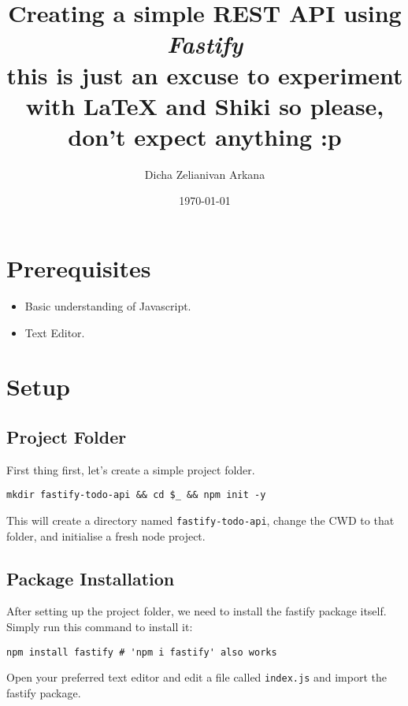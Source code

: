 \documentclass[a4paper,14pt,titlepage]{article}
\title{
  Creating a simple REST API using \textbf{\textit{Fastify}}\\[2ex]
  \small this is just an excuse to experiment with {\LaTeX} and Shiki so
  please, don't expect anything :p
}
\author{Dicha Zelianivan Arkana}
\date{\today}
\def\c#1{\texttt{#1}}
\begin{document}
\setlength{\parindent}{0pt}


\maketitle\newpage

\renewcommand{\contentsname}{Table of Contents}
\tableofcontents\newpage

\section{Prerequisites}

\begin{itemize}
  \item Basic understanding of Javascript.
  \item Text Editor.
\end{itemize}

\section{Setup}
\subsection{Project Folder}

First thing first, let's create a simple project folder.

\begin{verbatim}
mkdir fastify-todo-api && cd $_ && npm init -y
\end{verbatim}

This will create a directory named \c{fastify-todo-api}, change the CWD
to that folder, and initialise a fresh node project.

\subsection{Package Installation}

After setting up the project folder, we need to install the fastify package
itself. Simply run this command to install it:

\begin{verbatim}
npm install fastify # 'npm i fastify' also works
\end{verbatim}

Open your preferred text editor and edit a file called
\c{index.js} and import the fastify package.
\end{document}
